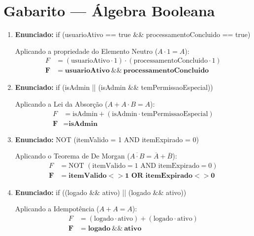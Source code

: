 \documentclass[12pt]{article}
\begin{document}
\section*{Gabarito — Álgebra Booleana}

\begin{enumerate}[label=\textbf{\arabic*.}]

\item \textbf{Enunciado:} if (usuarioAtivo == true \&\& processamentoConcluido == true)
\begin{solucao}
Aplicando a propriedade do Elemento Neutro ($A \cdot 1 = A$):
\begin{align*}
    F &= (\text{usuarioAtivo} \cdot 1) \cdot (\text{processamentoConcluido} \cdot 1) \\
    \mathbf{F} &= \mathbf{\text{usuarioAtivo} \ \&\& \ \text{processamentoConcluido}}
\end{align*}
\end{solucao}

\item \textbf{Enunciado:} if (isAdmin || (isAdmin \&\& temPermissaoEspecial))
\begin{solucao}
Aplicando a Lei da Absorção ($A + A \cdot B = A$):
\begin{align*}
    F &= \text{isAdmin} + (\text{isAdmin} \cdot \text{temPermissaoEspecial}) \\
    \mathbf{F} &= \mathbf{\text{isAdmin}}
\end{align*}
\end{solucao}

\item \textbf{Enunciado:} NOT (itemValido = 1 AND itemExpirado = 0)
\begin{solucao}
Aplicando o Teorema de De Morgan ($\overline{A \cdot B} = \overline{A} + \overline{B}$):
\begin{align*}
    F &= \text{NOT } (\text{itemValido} = 1 \text{ AND } \text{itemExpirado} = 0) \\
    \mathbf{F} &= \mathbf{\text{itemValido} <> 1 \text{ OR } \text{itemExpirado} <> 0}
\end{align*}
\end{solucao}

\item \textbf{Enunciado:} if ((logado \&\& ativo) || (logado \&\& ativo))
\begin{solucao}
Aplicando a Idempotência ($A + A = A$):
\begin{align*}
    F &= (\text{logado} \cdot \text{ativo}) + (\text{logado} \cdot \text{ativo}) \\
    \mathbf{F} &= \mathbf{\text{logado} \ \&\& \ \text{ativo}}
\end{align*}
\end{solucao}


\end{enumerate}
\end{document}
